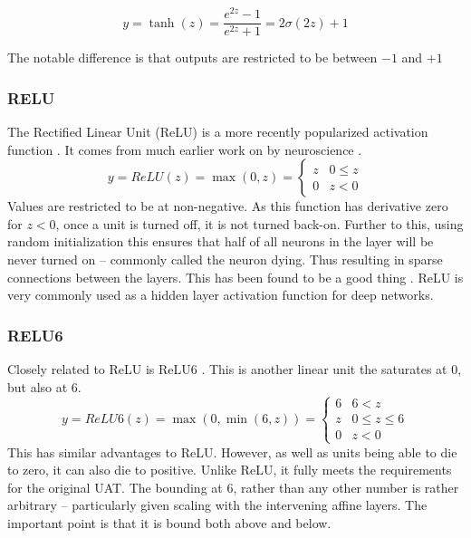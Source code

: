 \documentclass[12pt,parskip]{komatufte}
\begin{document}
\begin{equation}
y=\tanh(z)=\frac{e^{2z}-1}{e^{2z}+1}=2\sigma(2z)+1
\end{equation}

The notable difference is that outputs are restricted to be between $-1$ and $+1$

\subsubsection{RELU}
The Rectified Linear Unit (ReLU) is a more recently popularized activation function .
It comes from much earlier work on by neuroscience .
\begin{equation}
y=ReLU(z)=\max \left( 0, z \right)=\begin{cases}
z & 0\le z\\
0 & z<0
\end{cases}
\end{equation}
Values are restricted to be at non-negative.
As this function has derivative zero for $z<0$, once a unit is turned off, it is not turned back-on.
Further to this, using random initialization this ensures that half of all neurons in the layer will be never turned on -- commonly called the neuron dying.
Thus resulting in sparse connections between the layers.
This has been found to be a good thing .
ReLU is very commonly used as a hidden layer activation function for deep networks.



\subsubsection{RELU6}

Closely related to ReLU is ReLU6 .
This is another linear unit the saturates at 0, but also at 6.
\begin{equation}
y=ReLU6(z)=\max \left(0, \min\left(6, z\right) \right) =  \begin{cases}
6 & 6<z\\
z & 0\le z\le6\\
0 & z<0
\end{cases}
\end{equation}
This has similar advantages to ReLU.
However, as well as units being able to die to zero, it can also die to positive.
Unlike ReLU, it fully meets the requirements for the original UAT.
The bounding at 6, rather than any other number is rather arbitrary -- particularly given scaling with the intervening affine layers.
The important point is that it is bound both above and below.
\end{document}
